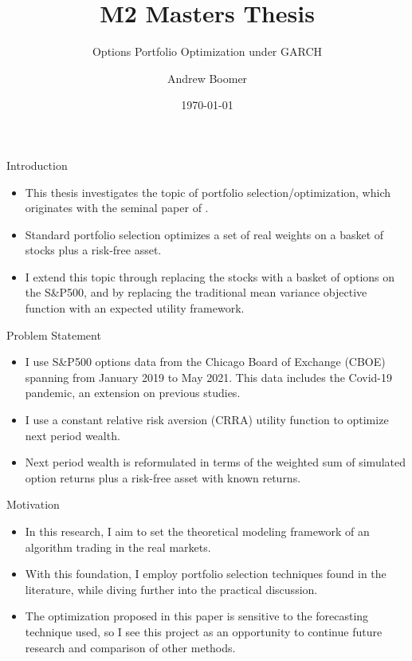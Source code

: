 \documentclass[9pt]{beamer}
\title{M2 Masters Thesis}
\subtitle{Options Portfolio Optimization under GARCH}
\author{Andrew Boomer}
\date{\today}
\begin{document}
\frame{\titlepage}

\begin{frame}{Introduction}
    \begin{itemize}
        \item This thesis investigates the topic of portfolio selection/optimization, which originates with the seminal paper of \cite{markowitz}.
        \item Standard portfolio selection optimizes a set of real weights on a basket of stocks plus a risk-free asset.
        \item I extend this topic through replacing the stocks with a basket of options on the S\&P500, and by replacing the traditional mean variance objective function with an expected utility framework.
    \end{itemize}
\end{frame}

\begin{frame}{Problem Statement}
    \begin{itemize}
        \item I use S\&P500 options data from the Chicago Board of Exchange (CBOE) spanning from January 2019 to May 2021. This data includes the Covid-19 pandemic, an extension on previous studies.
        \item I use a constant relative risk aversion (CRRA) utility function to optimize next period wealth.
        \item Next period wealth is reformulated in terms of the weighted sum of simulated option returns plus a risk-free asset with known returns.
    \end{itemize}
\end{frame}

\begin{frame}{Motivation}
    \begin{itemize}
        \item In this research, I aim to set the theoretical modeling framework of an algorithm trading in the real markets. 
        \item With this foundation, I employ portfolio selection techniques found in the literature, while diving further into the practical discussion.
        \item The optimization proposed in this paper is sensitive to the forecasting technique used, so I see this project as an opportunity to continue future research and comparison of other methods.
    \end{itemize}
\end{frame}
\end{document}
